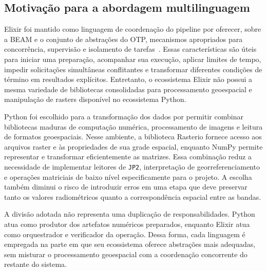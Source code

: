 \documentclass[tcc,capa]{texufpel}
\begin{document}
\subsection{Motivação para a abordagem multilinguagem}

Elixir foi mantido como linguagem de coordenação do pipeline por oferecer, sobre a
BEAM e o conjunto de abstrações do OTP, mecanismos apropriados para concorrência,
supervisão e isolamento de tarefas~\cite{elixirDocs2026,erlangOtpDocs2026}. Essas
características são úteis para iniciar uma preparação, acompanhar sua execução,
aplicar limites de tempo, impedir solicitações simultâneas conflitantes e
transformar diferentes condições de término em resultados explícitos. Entretanto,
o ecossistema Elixir não possui a mesma variedade de bibliotecas consolidadas para
processamento geoespacial e manipulação de rasters disponível no ecossistema
Python.

Python foi escolhido para a transformação dos dados por permitir combinar
bibliotecas maduras de computação numérica, processamento de imagens e leitura de
formatos geoespaciais. Nesse ambiente, a biblioteca Rasterio fornece acesso aos
arquivos raster e às propriedades de sua grade espacial, enquanto NumPy permite
representar e transformar eficientemente as matrizes. Essa combinação reduz a
necessidade de implementar leitores de \texttt{JP2}, interpretação de
georreferenciamento e operações matriciais de baixo nível especificamente para o
projeto. A escolha também diminui o risco de introduzir erros em uma etapa que deve
preservar tanto os valores radiométricos quanto a correspondência espacial entre as
bandas.

A divisão adotada não representa uma duplicação de responsabilidades. Python atua
como produtor dos artefatos numéricos preparados, enquanto Elixir atua como
orquestrador e verificador da operação. Dessa forma, cada linguagem é empregada na
parte em que seu ecossistema oferece abstrações mais adequadas, sem misturar o
processamento geoespacial com a coordenação concorrente do restante do sistema.
\end{document}
